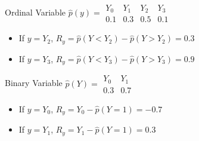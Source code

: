 \documentclass{beamer}
\begin{document}
\begin{frame}
	\frametitle{}
	\begin{block}{Ordinal Variable}
		\vspace{1em}
			$ \hat{p}(y) = \begin{array}{llll} Y_0 & Y_1 & Y_2 & Y_3 \\ 0.1 & 0.3 & 0.5 & 0.1 \end{array} $
		\begin{itemize}
			\item If $ y = Y_2 $, $ R_{y} = \hat{p}(Y < Y_2) - \hat{p}(Y > Y_2) = 0.3 $
			\item If $ y = Y_3 $, $ R_{y} = \hat{p}(Y < Y_3) - \hat{p}(Y > Y_3) = 0.9 $
		\end{itemize}
	\end{block}
	\begin{block}{Binary Variable}
		$\hat{p}(Y) = \begin{array}{ll} Y_0 & Y_1 \\ 0.3 & 0.7 \end{array} $
		\begin{itemize}	
			\item If $ y = Y_0 $, $ R_{y} = Y_0 - \hat{p}(Y=1) = -0.7 $
			\item If $ y = Y_1 $, $ R_{y} = Y_1 - \hat{p}(Y=1) = 0.3 $
		\end{itemize}
	\end{block}
\end{frame}
\end{document}

